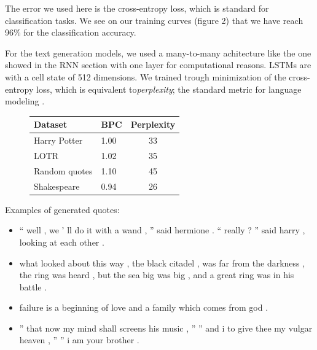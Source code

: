 The error we used here is the cross-entropy loss, which is standard for 
classification tasks. We see on our training curves (figure 2) that we 
have reach 96\% for the classification accuracy.

\vspace{0.2in} 

For the text generation models, we used a many-to-many achitecture like 
the one showed in the RNN section with one layer for computational reasons.
LSTMs are with a cell state of 512 dimensions. We trained trough minimization 
of the cross-entropy loss, which is equivalent to\textit{perplexity}; the 
standard metric for language modeling \cite{gravesGenerating}.
\begin{figure}[htbp!]
\begin{tabular}{|l|l|c|}
\hline
Dataset & BPC & Perplexity \\
\hline
Harry Potter & 1.00 & 33 \\
LOTR & 1.02 & 35 \\
Random quotes & 1.10 & 45 \\
Shakespeare & 0.94 & 26\\
\hline
\end{tabular}
\end{figure}

Examples of generated quotes:
\begin{itemize}\compresslist
    \item `` well , we ' ll do it with a wand , '' said hermione . `` really ?
      '' said harry , looking at each other .
    \item  what looked about this
      way , the black citadel , was far from the
          darkness , the ring was heard , but the sea big was big , and a great
          ring was in his battle .
    \item failure is a beginning of love and a family which comes from god .
    \item  '' that now my mind shall screens his music , '' '' and i to give
      thee my vulgar heaven , '' '' i am your brother .
\end{itemize}
